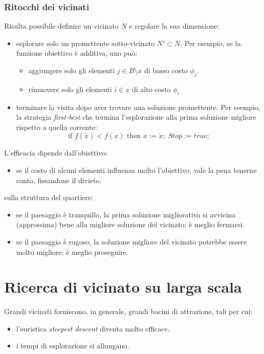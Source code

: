 \documentclass{article}
\begin{document}
\subsubsection{Ritocchi dei vicinati}
Risulta possibile definire un vicinato $N$ e regolare la sua dimensione:
\begin{itemize}
    \item esplorare solo un promettente sotto-vicinato $N'\subset N$. Per esempio,
    se la funzione obiettivo è additiva, uno può:
    \begin{itemize}
        \item aggiungere solo gli elementi $j\in B\setminus x$ di basso costo $\phi_j$.
        \item rimuovere solo gli elementi $i\in x$ di alto costo $\phi_i$
    \end{itemize}

    \item terminare la visita dopo aver trovare una soluzione promettente. Per esempio,
    la strategia \textit{first-best} che termina l'esplorazione alla prima soluzione migliore
    rispetto a quella corrente:
    $$\text{if }f(\tilde{x})<f(x)\text{ then }x:=\tilde{x};\;Stop:=true;$$
\end{itemize}
L'efficacia dipende dall'obiettivo:
\begin{itemize}
    \item se il costo di alcuni elementi influenza molto l'obiettivo,
    vale la pena tenerne conto, fissandone il divieto.
\end{itemize}
sulla struttura del quartiere:
\begin{itemize}
    \item se il paesaggio è tranquillo, la prima soluzione migliorativa si avvicina (approssima) bene
    alla migliore soluzione del vicinato: è meglio fermarsi.

    \item se il paesaggio è rugoso, la soluzione migliore del vicinato potrebbe essere molto migliore:
    è meglio proseguire.
\end{itemize}

\section{Ricerca di vicinato su larga scala}
Grandi vicinati forniscono, in generale, grandi
bacini di attrazione, tali per cui:
\begin{itemize}
    \item l'euristica \textit{steepest descent} diventa molto efficace.
    \item i tempi di esplorazione si allungano.
\end{itemize}
\end{document}
